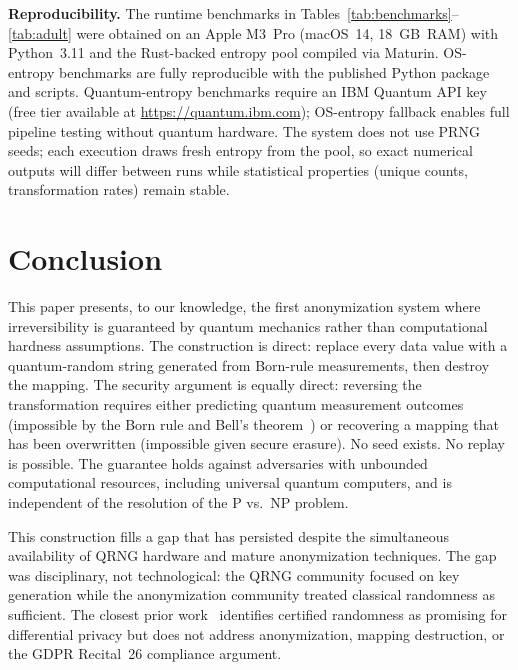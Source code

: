 \documentclass[journal]{IEEEtran}
\begin{document}
\textbf{Reproducibility.} The runtime benchmarks in Tables~\ref{tab:benchmarks}--\ref{tab:adult} were obtained on an Apple M3~Pro (macOS~14, 18~GB~RAM) with Python~3.11 and the Rust-backed entropy pool compiled via Maturin. OS-entropy benchmarks are fully reproducible with the published Python package and scripts. Quantum-entropy benchmarks require an IBM Quantum API key (free tier available at \url{https://quantum.ibm.com}); OS-entropy fallback enables full pipeline testing without quantum hardware. The system does not use PRNG seeds; each execution draws fresh entropy from the pool, so exact numerical outputs will differ between runs while statistical properties (unique counts, transformation rates) remain stable.

\section{Conclusion}
\label{sec:conclusion}

This paper presents, to our knowledge, the first anonymization system where irreversibility is guaranteed by quantum mechanics rather than computational hardness assumptions. The construction is direct: replace every data value with a quantum-random string generated from Born-rule measurements, then destroy the mapping. The security argument is equally direct: reversing the transformation requires either predicting quantum measurement outcomes (impossible by the Born rule and Bell's theorem~\cite{bell1964epr, hensen2015loophole}) or recovering a mapping that has been overwritten (impossible given secure erasure). No seed exists. No replay is possible. The guarantee holds against adversaries with unbounded computational resources, including universal quantum computers, and is independent of the resolution of the P vs.\ NP problem.

This construction fills a gap that has persisted despite the simultaneous availability of QRNG hardware and mature anonymization techniques. The gap was disciplinary, not technological: the QRNG community focused on key generation while the anonymization community treated classical randomness as sufficient. The closest prior work~\cite{amer2025certified} identifies certified randomness as promising for differential privacy but does not address anonymization, mapping destruction, or the GDPR Recital~26 compliance argument.
\end{document}
